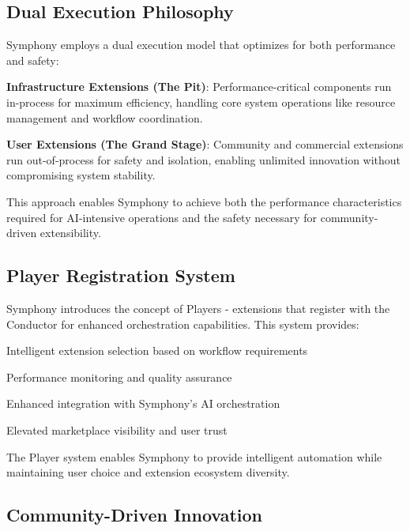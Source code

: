 \subsection*{Dual Execution Philosophy}

Symphony employs a \textcolor{brandTertiary}{dual execution model} that optimizes for both performance and safety:

\begin{infobox}[title=Dual Execution Strategy]
\textbf{Infrastructure Extensions (The Pit)}: Performance-critical components run in-process for maximum efficiency, handling core system operations like resource management and workflow coordination.

\textbf{User Extensions (The Grand Stage)}: Community and commercial extensions run out-of-process for safety and isolation, enabling unlimited innovation without compromising system stability.
\end{infobox}

This approach enables Symphony to achieve both the performance characteristics required for AI-intensive operations and the safety necessary for community-driven extensibility.

\subsection*{Player Registration System}

Symphony introduces the concept of \textcolor{brandPrimary}{Players} - extensions that register with the Conductor for enhanced orchestration capabilities. This system provides:

\begin{compactlist}
    \item Intelligent extension selection based on workflow requirements
    \item Performance monitoring and quality assurance
    \item Enhanced integration with Symphony's AI orchestration
    \item Elevated marketplace visibility and user trust
\end{compactlist}

The Player system enables Symphony to provide intelligent automation while maintaining user choice and extension ecosystem diversity.

\subsection*{Community-Driven Innovation}

